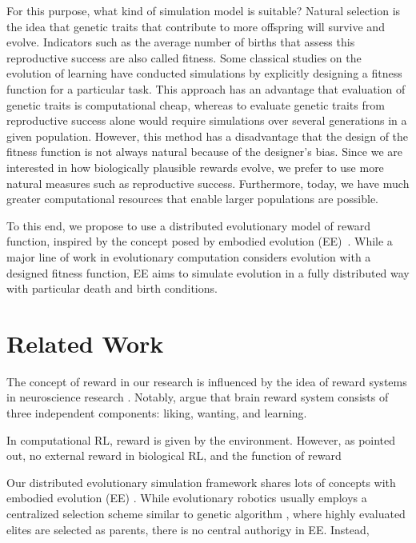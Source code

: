 For this purpose, what kind of simulation model is suitable? Natural selection is the idea that genetic traits that contribute to more offspring will survive and evolve. Indicators such as the average number of births that assess this reproductive success are also called fitness. Some classical studies on the evolution of learning \citep{hintonHowLearningCan1987} have conducted simulations by explicitly designing a fitness function for a particular task. This approach has an advantage that evaluation of genetic traits is computational cheap, whereas to evaluate genetic traits from reproductive success alone would require simulations over several generations in a given population. However, this method has a disadvantage that the design of the fitness function is not always natural because of the designer's bias. Since we are interested in how biologically plausible rewards evolve, we prefer to use more natural measures such as reproductive success. Furthermore, today, we have much greater computational resources that enable larger populations are possible.

To this end, we propose to use a distributed evolutionary model of reward function, inspired by the concept posed by embodied evolution (EE)~\cite{watsonEmbodiedEvolutionDistributing2002}. While a major line of work in evolutionary computation considers evolution with a designed fitness function, EE aims to simulate evolution in a fully distributed way with particular death and birth conditions.


\section{Related Work}\label{sec:related}
The concept of reward in our research is influenced by the idea of reward systems in neuroscience research \citep{schultzNeuronalRewardDecision2015, berridgePleasureSystemsBrain2015}. Notably, \citet{berridgeDissectingComponentsReward2009} argue that brain reward system consists of three independent components: liking, wanting, and learning.

In computational RL, reward is given by the environment. However, as \citet{singhWhereRewardsCome} pointed out, no external reward in biological RL, and the function of reward

Our distributed evolutionary simulation framework shares lots of concepts with embodied evolution (EE) \citep{watsonEmbodiedEvolutionDistributing2002,bredecheEmbodiedEvolutionCollective2018}. While evolutionary robotics \citep{nolfiEvolutionaryRoboticsBiology2004} usually employs a centralized selection scheme similar to genetic algorithm \citep{melanieIntroductionGeneticAlgorithms}, where highly evaluated elites are selected as parents, there is no central authorigy in EE. Instead,

